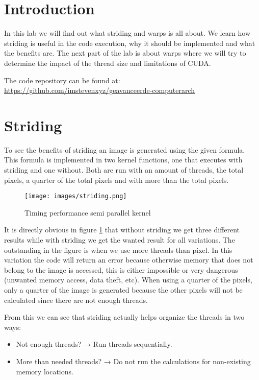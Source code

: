 
\section{Introduction}
\label{sec:introduction}
In this lab we will find out what striding and warps is all about. We learn how striding is useful in the code execution, why it should be implemented and what the benefits are. The next part of the lab is about warps where we will try to determine the impact of the thread size and limitations of CUDA.

The code repository can be found at: \\
\url{https://github.com/imstevenxyz/geavanceerde-computerarch}

\section{Striding}
\label{sec:striding}

To see the benefits of striding an image is generated using the given formula. This formula is implemented in two kernel functions, one that executes with striding and one without. Both are run with an amount of threads, the total pixels, a quarter of the total pixels and with more than the total pixels.

\begin{figure}[H]
    \centering
    \texttt{[image: images/striding.png]}
    \caption{Timing performance semi parallel kernel}
    \label{figure:striding}
\end{figure}

It is directly obvious in figure \ref{figure:striding} that without striding we get three different results while with striding we get the wanted result for all variations. The outstanding in the figure is when we use more threads than pixel. In this variation the code will return an error because otherwise memory that does not belong to the image is accessed, this is either impossible or very dangerous (unwanted memory access, data theft, etc). When using a quarter of the pixels, only a quarter of the image is generated because the other pixels will not be calculated since there are not enough threads.

From this we can see that striding actually helps organize the threads in two ways:
\begin{itemize}
    \item Not enough threads? → Run threads sequentially.
    \item More than needed threads? → Do not run the calculations for non-existing memory locations.
\end{itemize}

